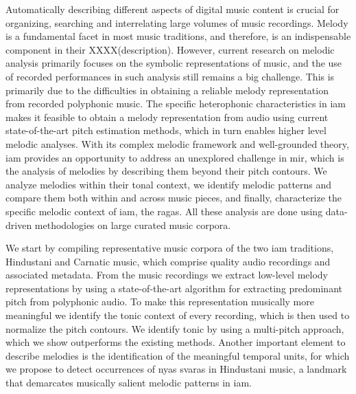 
Automatically describing different aspects of digital music content is crucial for organizing, searching and interrelating large volumes of music recordings. Melody is a fundamental facet in most music traditions, and therefore, is an indispensable component in their XXXX(description). However, current research on melodic analysis primarily focuses on the symbolic representations of music, and the use of recorded performances in such analysis still remains a big challenge. This is primarily due to the difficulties in obtaining a reliable melody representation from recorded polyphonic music. The specific heterophonic characteristics in \acrfull{iam} makes it feasible to obtain a melody representation from audio using current state-of-the-art pitch estimation methods, which in turn enables higher level melodic analyses. With its complex melodic framework and well-grounded theory, \gls{iam} provides an opportunity to address an unexplored challenge in \gls{mir}, which is the analysis of melodies by describing them beyond their pitch contours. We analyze melodies within their tonal context, we identify melodic patterns and compare them both within and across music pieces, and finally, characterize the specific melodic context of \gls{iam}, the \glspl{raga}. All these analysis are done using data-driven methodologies on large curated music corpora. 

We start by compiling representative music corpora of the two \gls{iam} traditions, Hindustani and Carnatic music, which comprise quality audio recordings and associated metadata. From the music recordings we extract low-level melody representations by using a state-of-the-art algorithm for extracting predominant pitch from polyphonic audio. 
To make this representation musically more meaningful we identify the tonic context of every recording, which is then used to normalize the pitch contours. We identify tonic by using a multi-pitch approach, which we show outperforms the existing methods. Another important element to describe melodies is the identification of the meaningful temporal units, for which we propose to detect occurrences of nyas svaras in Hindustani music, a landmark that demarcates musically salient melodic patterns in \gls{iam}.

